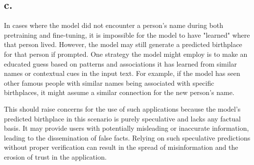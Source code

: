 \documentclass[a4paper]{article}
\begin{document}
\subsection*{c.}

In cases where the model did not encounter a person's name during both pretraining and fine-tuning, it is impossible for the model to have "learned" where that person lived. However, the model may still generate a predicted birthplace for that person if prompted. One strategy the model might employ is to make an educated guess based on patterns and associations it has learned from similar names or contextual cues in the input text. For example, if the model has seen other famous people with similar names being associated with specific birthplaces, it might assume a similar connection for the new person's name.

This should raise concerns for the use of such applications because the model's predicted birthplace in this scenario is purely speculative and lacks any factual basis. It may provide users with potentially misleading or inaccurate information, leading to the dissemination of false facts. Relying on such speculative predictions without proper verification can result in the spread of misinformation and the erosion of trust in the application.
\end{document}
